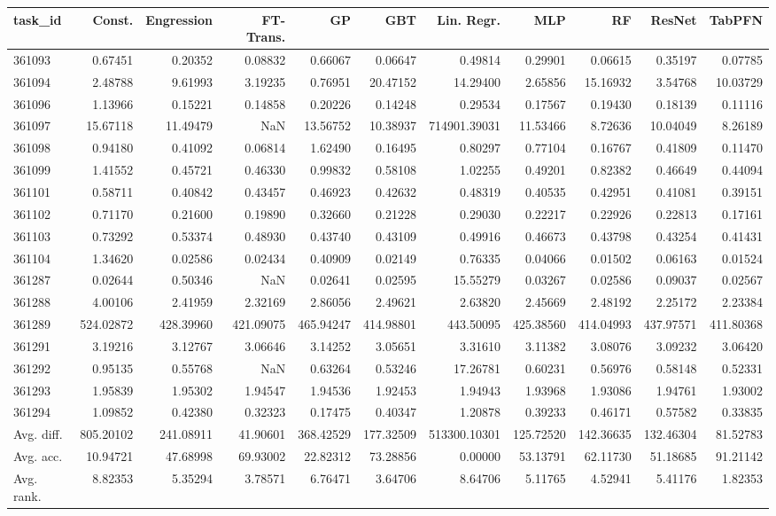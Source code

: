 \begin{tabular}{lrrrrrrrrrr}
\toprule
task\_id & Const. & Engression & FT-Trans. & GP & GBT & Lin. Regr. & MLP & RF & ResNet & TabPFN \\
\midrule
361093 & 0.67451 & 0.20352 & 0.08832 & 0.66067 & 0.06647 & 0.49814 & 0.29901 & 0.06615 & 0.35197 & 0.07785 \\
361094 & 2.48788 & 9.61993 & 3.19235 & 0.76951 & 20.47152 & 14.29400 & 2.65856 & 15.16932 & 3.54768 & 10.03729 \\
361096 & 1.13966 & 0.15221 & 0.14858 & 0.20226 & 0.14248 & 0.29534 & 0.17567 & 0.19430 & 0.18139 & 0.11116 \\
361097 & 15.67118 & 11.49479 & NaN & 13.56752 & 10.38937 & 714901.39031 & 11.53466 & 8.72636 & 10.04049 & 8.26189 \\
361098 & 0.94180 & 0.41092 & 0.06814 & 1.62490 & 0.16495 & 0.80297 & 0.77104 & 0.16767 & 0.41809 & 0.11470 \\
361099 & 1.41552 & 0.45721 & 0.46330 & 0.99832 & 0.58108 & 1.02255 & 0.49201 & 0.82382 & 0.46649 & 0.44094 \\
361101 & 0.58711 & 0.40842 & 0.43457 & 0.46923 & 0.42632 & 0.48319 & 0.40535 & 0.42951 & 0.41081 & 0.39151 \\
361102 & 0.71170 & 0.21600 & 0.19890 & 0.32660 & 0.21228 & 0.29030 & 0.22217 & 0.22926 & 0.22813 & 0.17161 \\
361103 & 0.73292 & 0.53374 & 0.48930 & 0.43740 & 0.43109 & 0.49916 & 0.46673 & 0.43798 & 0.43254 & 0.41431 \\
361104 & 1.34620 & 0.02586 & 0.02434 & 0.40909 & 0.02149 & 0.76335 & 0.04066 & 0.01502 & 0.06163 & 0.01524 \\
361287 & 0.02644 & 0.50346 & NaN & 0.02641 & 0.02595 & 15.55279 & 0.03267 & 0.02586 & 0.09037 & 0.02567 \\
361288 & 4.00106 & 2.41959 & 2.32169 & 2.86056 & 2.49621 & 2.63820 & 2.45669 & 2.48192 & 2.25172 & 2.23384 \\
361289 & 524.02872 & 428.39960 & 421.09075 & 465.94247 & 414.98801 & 443.50095 & 425.38560 & 414.04993 & 437.97571 & 411.80368 \\
361291 & 3.19216 & 3.12767 & 3.06646 & 3.14252 & 3.05651 & 3.31610 & 3.11382 & 3.08076 & 3.09232 & 3.06420 \\
361292 & 0.95135 & 0.55768 & NaN & 0.63264 & 0.53246 & 17.26781 & 0.60231 & 0.56976 & 0.58148 & 0.52331 \\
361293 & 1.95839 & 1.95302 & 1.94547 & 1.94536 & 1.92453 & 1.94943 & 1.93968 & 1.93086 & 1.94761 & 1.93002 \\
361294 & 1.09852 & 0.42380 & 0.32323 & 0.17475 & 0.40347 & 1.20878 & 0.39233 & 0.46171 & 0.57582 & 0.33835 \\
Avg. diff. & 805.20102 & 241.08911 & 41.90601 & 368.42529 & 177.32509 & 513300.10301 & 125.72520 & 142.36635 & 132.46304 & 81.52783 \\
Avg. acc. & 10.94721 & 47.68998 & 69.93002 & 22.82312 & 73.28856 & 0.00000 & 53.13791 & 62.11730 & 51.18685 & 91.21142 \\
Avg. rank. & 8.82353 & 5.35294 & 3.78571 & 6.76471 & 3.64706 & 8.64706 & 5.11765 & 4.52941 & 5.41176 & 1.82353 \\
\bottomrule
\end{tabular}
